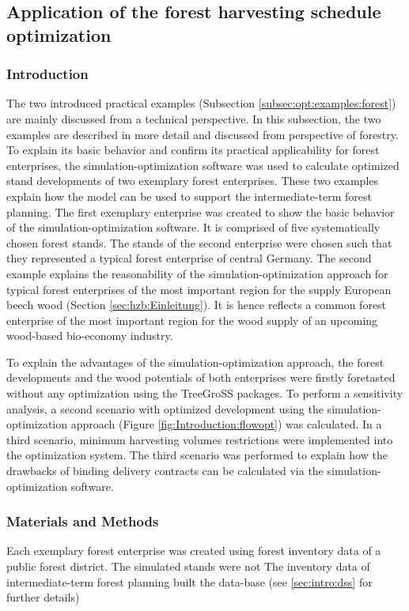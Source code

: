 \subsection{Application of the forest harvesting schedule optimization}
\label{subsec:discussion:struct:opt:application}
\subsubsection{Introduction}
\label{subsubsec:discussion:struct:opt:application:introduction}
The two introduced practical examples (Subsection \ref{subsec:opt:examples:forest}) are mainly discussed from a technical perspective. In this subsection, the two examples are described in more detail and discussed from perspective of forestry. To explain its basic behavior and confirm its practical applicability for forest enterprises, the si\-mu\-la\-tion-op\-ti\-mi\-za\-tion software was used to calculate optimized stand developments of two exemplary forest enterprises. These two examples explain how the model can be used to support the intermediate-term forest planning. The first exemplary enterprise was created to show the basic behavior of the simulation-optimization software. It is comprised of five systematically chosen forest stands. The stands of the second enterprise were chosen such that they represented a typical forest enterprise of central Germany. The second example explains the reasonability of the simulation-optimization approach for typical forest enterprises of the most important region for the supply European beech wood (Section \ref{sec:hzb:Einleitung}). It is hence reflects a common forest enterprise of the most important region for the wood supply of an upcoming wood-based bio-economy industry.

To explain the advantages of the simulation-optimization approach, the forest developments and the wood potentials of both enterprises were firstly foretasted without any optimization using the TreeGroSS packages. To perform a sensitivity analysis, a second scenario with optimized development using the simulation-optimization approach (Figure \ref{fig:Introduction:flowopt}) was calculated. In a third scenario, minimum harvesting volumes restrictions were implemented into the optimization system. The third scenario was performed to explain how the drawbacks of binding delivery contracts can be calculated via the si\-mu\-la\-tion-op\-ti\-mi\-za\-tion software.

\subsubsection{Materials and Methods}
\label{subsubsec:discussion:struct:opt:application:method}
Each exemplary forest enterprise was created using forest inventory data of a public forest district. The simulated stands were not 
The inventory data of intermediate-term forest planning built the data-base
 (see \ref{sec:intro:dss} for further details)
 
